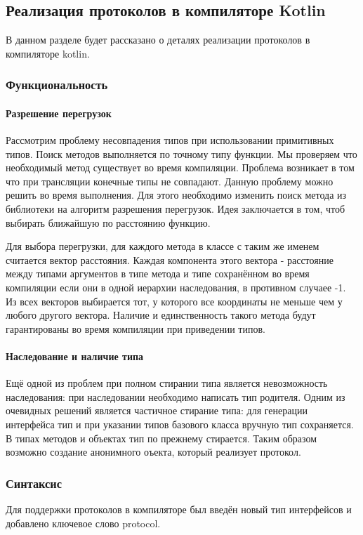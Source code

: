 \subsection{Реализация протоколов в компиляторе Kotlin}
В данном разделе будет рассказано о деталях реализации протоколов в компиляторе kotlin.

\subsubsection{Функциональность}

\paragraph{Разрешение перегрузок}
Рассмотрим проблему несовпадения типов при использовании примитивных типов. Поиск методов выполняется по точному типу функции. Мы проверяем что необходимый метод существует во время компиляции. Проблема возникает в том что при трансляции конечные типы не совпадают. Данную проблему можно решить во время выполнения. Для этого необходимо изменить поиск метода из библиотеки на алгоритм разрешения перегрузок. Идея заключается в том, чтоб выбирать ближайшую по расстоянию функцию.

Для выбора перегрузки, для каждого метода в классе с таким же именем считается вектор расстояния. Каждая компонента этого вектора - расстояние между типами аргументов в типе метода и типе сохранённом во время компиляции если они в одной иерархии наследования, в противном случаее -1. Из всех векторов выбирается тот, у которого все координаты не меньше чем у любого другого вектора. Наличие и единственность такого метода будут гарантированы во время компиляции при приведении типов.

\paragraph{Наследование и наличие типа}
Ещё одной из проблем при полном стирании типа является невозможность наследования: при наследовании необходимо написать тип родителя. Одним из очевидных решений является частичное стирание типа: для генерации интерфейса тип и при указании типов базового класса вручную тип сохраняется. В типах методов и объектах тип по прежнему стирается. Таким образом возможно создание анонимного оъекта, который реализует протокол.

\subsubsection{Синтаксис}
Для поддержки протоколов в компиляторе был введён новый тип интерфейсов и добавлено ключевое слово protocol.

